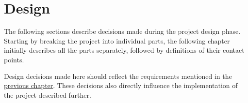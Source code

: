 \chapter{Design}

The following sections describe decisions made during the project design phase.
Starting by breaking the project into individual parts, the following chapter initially describes all the parts separately, followed by definitions of their contact points.

Design decisions made here should reflect the requirements mentioned in the \hyperref[requirements]{previous chapter}.
These decisions also directly influence the implementation of the project described further.








